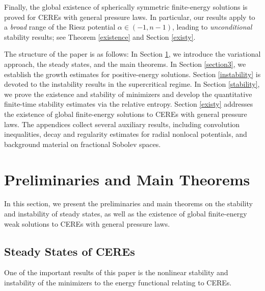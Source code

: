 \documentclass[reqno,11pt]{amsart}
\numberwithin{equation}{section}
\theoremstyle{definition}
\begin{document}
\smallskip
Finally, the global existence of spherically symmetric finite-energy solutions is proved for 
CEREs with general pressure laws.
In particular, our results apply to a \textit{broad} range of 
the Riesz potential $\alpha\in(-1,n-1)$, 
leading to \emph{unconditional} stability results; 
see Theorem \ref{existence} and Section \ref{existy}.

\smallskip
The structure of the paper is as follows: 
In Section \ref{section2}, we introduce the variational approach, 
the steady states, and the main theorems.
In Section \ref{section3}, we establish the growth estimates for positive-energy solutions.
Section \ref{instability} is devoted to the instability results in the supercritical regime.
In Section \ref{stability}, we prove the existence and stability of minimizers
and develop the quantitative finite-time stability estimates via the relative entropy.
Section \ref{existy} addresses the existence of global finite-energy solutions to
CEREs with general pressure laws.
The appendices collect several auxiliary results, including convolution inequalities, 
decay and regularity estimates for radial nonlocal potentials, 
and background material on fractional Sobolev spaces.


\section{Preliminaries and Main Theorems}\label{section2}
In this section, we present the preliminaries and main theorems 
on the stability and instability of steady states, as well as 
the existence of global finite-energy weak solutions to CEREs with general pressure laws.

\subsection{Steady States of CEREs}
One of the important results of this paper is the nonlinear stability and instability
of the minimizers to the energy functional relating to CEREs.
\end{document}

